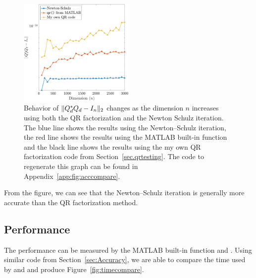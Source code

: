 \begin{figure}[ht]
\centering
\includegraphics[width=0.5\textwidth]{figs/acccompare.pdf}
\caption[Behavior of the quantity $\norm{Q_d\ctp Q_d - I_n}$ with the dimension $n$ increases using both the QR factorization and the Newton--Schulz iteration.]{Behavior of $\norm{Q_d\ctp Q_d - I_n}$ changes as the dimension $n$ increases using both the QR factorization and the Newton Schulz iteration. The blue line shows the results using the Newton--Schulz iteration, the red line shows the results using the MATLAB built-in  function and the black line shows the results using the my own QR factorization code  from Section~\ref{sec.qrtesting}. The code to regenerate this graph can be found in Appendix~\ref{app:fig:acccompare}.}
\label{fig:acccompare}
\end{figure}

From the figure, we can see that the Newton--Schulz iteration is generally more accurate than the QR factorization method. 

\subsection{Performance}\label{sec:qr-ns-performance}

The performance can be measured by the MATLAB built-in function  and . Using similar code from Section~\ref{sec:Accuracy}, we are able to compare the time used by  and  and produce Figure~\ref{fig:timecompare}.

